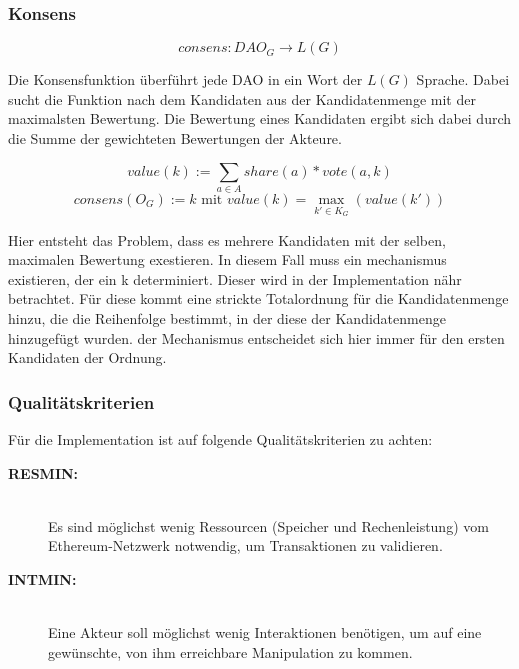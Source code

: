 \documentclass[a4paper,12pt]{article}
\begin{document}
% 




\subsubsection*{Konsens}

  \[consens: DAO_G \rightarrow L(G)\] 


Die Konsensfunktion überführt jede DAO in ein Wort der $L(G)$ Sprache.
Dabei sucht die Funktion nach dem Kandidaten aus der Kandidatenmenge mit der maximalsten Bewertung. Die Bewertung eines Kandidaten ergibt sich dabei durch die Summe der gewichteten Bewertungen der Akteure.

\[ value(k) := \sum_{a\in A} share(a) * vote(a,k) \] 
\[consens (O_G) := k\text{ mit }value(k) = \max_{k'\in K_G} (value(k'))\]

Hier entsteht das Problem, dass es mehrere Kandidaten mit der selben, maximalen Bewertung exestieren. In diesem Fall muss ein mechanismus existieren, der ein k determiniert. Dieser wird in der Implementation nähr betrachtet. Für diese kommt eine strickte Totalordnung für die Kandidatenmenge hinzu, die die Reihenfolge bestimmt, in der diese der Kandidatenmenge hinzugefügt wurden. der Mechanismus entscheidet sich hier immer für den ersten Kandidaten der Ordnung.





\subsubsection*{Qualitätskriterien}

Für die Implementation ist auf folgende Qualitätskriterien zu achten:

\begin{description} 
  \item[\textbf{RESMIN:}]\hfill \\
    Es sind möglichst wenig Ressourcen (Speicher und Rechenleistung) vom Ethereum-Netzwerk notwendig, um Transaktionen zu validieren.
  \item[\textbf{INTMIN:}]\hfill \\
    Eine Akteur soll möglichst wenig Interaktionen benötigen, um auf eine gewünschte, von ihm erreichbare Manipulation zu kommen.
\end{description}
\end{document}
